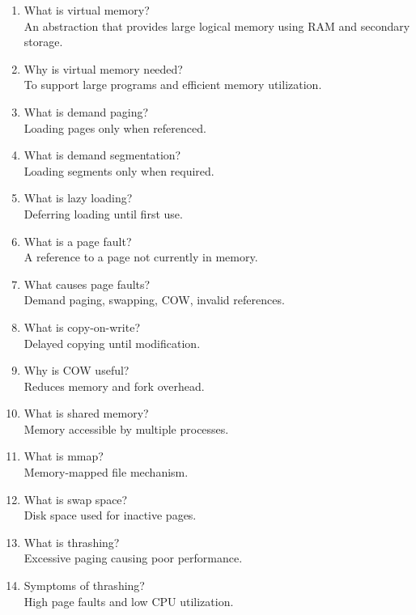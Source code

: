 \begin{enumerate}
\item What is virtual memory?\\
An abstraction that provides large logical memory using RAM and secondary storage.

\item Why is virtual memory needed?\\
To support large programs and efficient memory utilization.

\item What is demand paging?\\
Loading pages only when referenced.

\item What is demand segmentation?\\
Loading segments only when required.

\item What is lazy loading?\\
Deferring loading until first use.

\item What is a page fault?\\
A reference to a page not currently in memory.

\item What causes page faults?\\
Demand paging, swapping, COW, invalid references.

\item What is copy-on-write?\\
Delayed copying until modification.

\item Why is COW useful?\\
Reduces memory and fork overhead.

\item What is shared memory?\\
Memory accessible by multiple processes.

\item What is mmap?\\
Memory-mapped file mechanism.

\item What is swap space?\\
Disk space used for inactive pages.

\item What is thrashing?\\
Excessive paging causing poor performance.

\item Symptoms of thrashing?\\
High page faults and low CPU utilization.


\end{enumerate}
